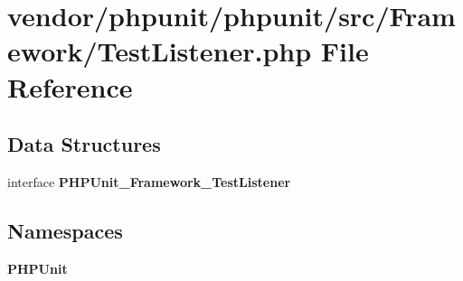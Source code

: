 \section{vendor/phpunit/phpunit/src/\+Framework/\+Test\+Listener.php File Reference}
\label{_test_listener_8php}
\subsection*{Data Structures}
\begin{DoxyCompactItemize}
\item 
interface {\bf P\+H\+P\+Unit\+\_\+\+Framework\+\_\+\+Test\+Listener}
\end{DoxyCompactItemize}
\subsection*{Namespaces}
\begin{DoxyCompactItemize}
\item 
 {\bf P\+H\+P\+Unit}
\end{DoxyCompactItemize}
